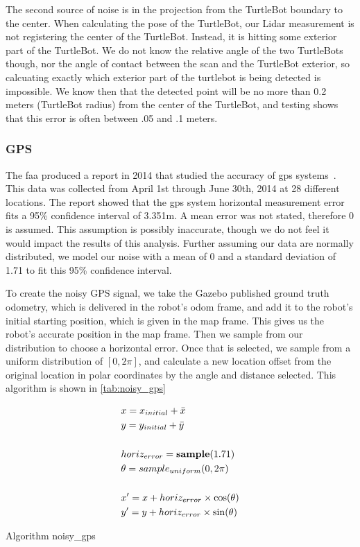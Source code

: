 \documentclass[thesis.tex]{subfile}
\begin{document}
The second source of noise is in the projection from the TurtleBot boundary to the center. When calculating the pose of the TurtleBot, our Lidar measurement is not registering the center of the TurtleBot. Instead, it is hitting some exterior part of the TurtleBot. We do not know the relative angle of the two TurtleBots though, nor the angle of contact between the scan and the TurtleBot exterior, so calcuating exactly which exterior part of the turtlebot is being detected is impossible. We know then that the detected point will be no more than 0.2 meters (TurtleBot radius) from the center of the TurtleBot, and testing shows that this error is often between .05 and .1 meters.

\subsubsection{GPS}
The \gls{faa} produced a report in 2014 that studied the accuracy of \gls{gps} systems~\cite{FAAGPS}. This data was collected from April 1st through June 30th, 2014 at 28 different locations. The report showed that the \gls{gps} system horizontal measurement error fits a 95\% confidence interval of 3.351m. A mean error was not stated, therefore 0 is assumed. This assumption is possibly inaccurate, though we do not feel it would impact the results of this analysis. Further assuming our data are normally distributed, we model our noise with a mean of 0 and a standard deviation of 1.71 to fit this 95\% confidence interval.

To create the noisy GPS signal, we take the Gazebo published ground truth odometry, which is delivered in the robot's odom frame, and add it to the robot's initial starting position, which is given in the map frame. This gives us the robot's accurate position in the map frame. Then we sample from our distribution to choose a horizontal error. Once that is selected, we sample from a uniform distribution of $[0, 2\pi]$, and calculate a new location offset from the original location in polar coordinates by the angle and distance selected. This algorithm is shown in \autoref{tab:noisy_gps}

\begin{table}
\centering
\begin{align}
&x = x_{initial} + \bar{x}\\
&y = y_{initial} + \bar{y}\\
\notag \\
&horiz_{error} = \textbf{sample}(1.71)\\
&\theta = \textbf{$sample_{uniform}$}(0, 2\pi)\\
\notag \\
&x' = x + horiz_{error} \times \cos(\theta)\\
&y' = y + horiz_{error} \times \sin(\theta)
\end{align}
\caption{Algorithm noisy\_gps}
\label{tab:noisy_gps}
\end{table}
\end{document}

